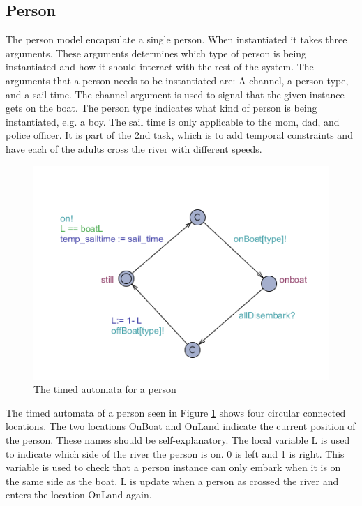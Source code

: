 















\subsection{Person}
The person model encapsulate a single person.
When instantiated it takes three arguments.
These arguments determines which type of person is being instantiated and how it should interact with the rest of the system.
The arguments that a person needs to be instantiated are: A channel, a person type, and a sail time.
The channel argument is used to signal that the given instance gets on the boat.
The person type indicates what kind of person is being instantiated, e.g. a boy.
The sail time is only applicable to the mom, dad, and police officer.
It is part of the 2nd task, which is to add temporal constraints and have each of the adults cross the river with different speeds.
\begin{figure}%
\includegraphics[width=\columnwidth]{pictures/person.png}%
\caption{The timed automata for a person}%
\label{fig:person}%
\end{figure}

The timed automata of a person seen in Figure \ref{fig:person} shows four circular connected locations.
The two locations OnBoat and OnLand indicate the current position of the person.
These names should be self-explanatory.
The local variable L is used to indicate which side of the river the person is on.
0 is left and 1 is right.
This variable is used to check that a person instance can only embark when it is on the same side as the boat.
L is update when a person as crossed the river and enters the location OnLand again.

